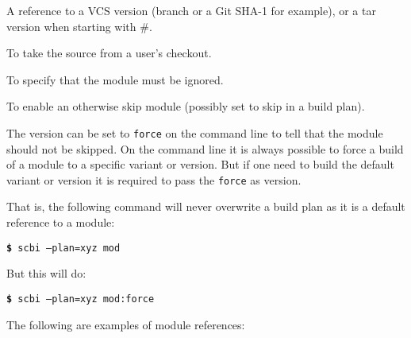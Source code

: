 \documentclass[a4paper,12pt,twoside]{article}
\newcommand{\code}[1]{\texttt{#1}}
\newcommand{\cmd}[1]{\tabto{1cm}\hspace{0.5cm}\texttt{\textbf{\$} #1}}
\begin{document}
\begin{description}[style=nextline]
	\begin{description}[font=\texttt]
		\item[<ID>] A reference to a VCS version (branch or a Git SHA-1 for example), or a tar version when starting with \#.
		\item[dev] To take the source from a user's checkout.
		\item[skip] To specify that the module must be ignored.
		\item[force] To enable an otherwise skip module (possibly set to skip in a build plan).
	\end{description}

	The version can be set to \code{force} on the command line to tell that the module should not be skipped. On the command line it is always possible to force a build of a module to a specific variant or version. But if one need to build the default variant or version it is required to pass the \code{force} as version.

	That is, the following command will never overwrite a build plan as it is a default reference to a module:

	\cmd{scbi --plan=xyz mod}

	But this will do:

	\cmd{scbi --plan=xyz mod:force}
\end{description}

The following are examples of module references:
\end{document}
